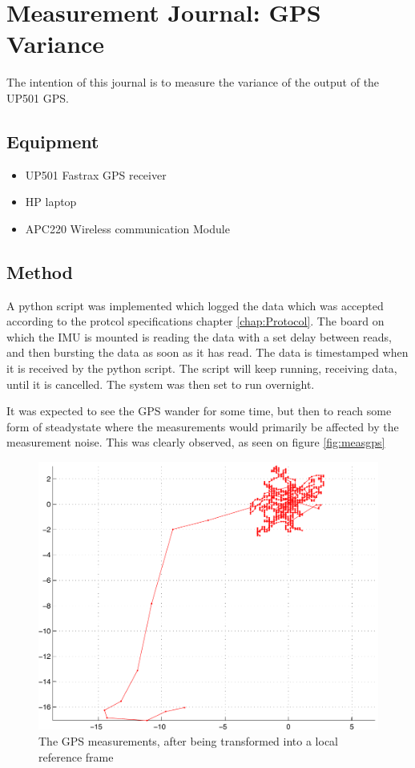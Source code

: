 \chapter{Measurement Journal: GPS Variance}
\label{chap:MeasJourGPS}
The intention of this journal is to measure the variance of the output of the UP501 GPS.
\section{Equipment}
\begin{itemize}
\item UP501 Fastrax GPS receiver
\item HP laptop
\item APC220 Wireless communication Module
\end{itemize}

\section{Method}
A python script was implemented which logged the data which was accepted according to the protcol specifications chapter \ref{chap:Protocol}. The board on which the IMU is mounted is reading the data with a set delay between reads, and then bursting the data as soon as it has read. The data is timestamped when it is received by the python script. The script will keep running, receiving data, until it is cancelled. The system was then set to run overnight.

It was expected to see the GPS wander for some time, but then to reach some form of steadystate where the measurements would primarily be affected by the measurement noise. This was clearly observed, as seen on figure \ref{fig:measgps}

\begin{figure}
\includegraphics[width=\textwidth]{img/gpsmeas.pdf}
\caption{The GPS measurements, after being transformed into a local reference frame}
\end{figure}
\label{fig:measgps}

